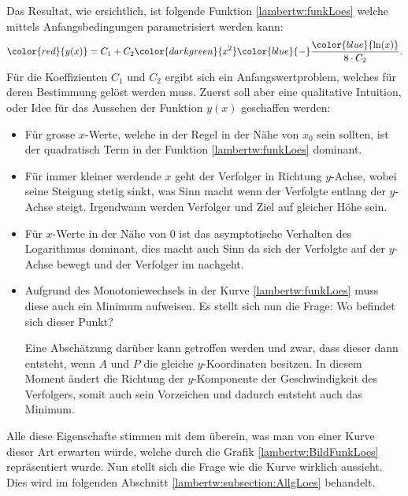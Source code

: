 Das Resultat, wie ersichtlich, ist folgende Funktion \eqref{lambertw:funkLoes} welche mittels Anfangsbedingungen parametrisiert werden kann: 
\begin{equation}
	{\color{red}{y(x)}}
	=
	C_1 + C_2 {\color{darkgreen}{x^2}} {\color{blue}{-}} \frac{\color{blue}{\operatorname{ln}(x)}}{8 \cdot C_2}.
	\label{lambertw:funkLoes}
\end{equation}
Für die Koeffizienten \(C_1\) und \(C_2\) ergibt sich ein Anfangswertproblem, welches für deren Bestimmung gelöst werden muss. Zuerst soll aber eine qualitative Intuition, oder Idee für das Aussehen der Funktion \(y(x)\) geschaffen werden:
\begin{itemize}
	\item
	Für grosse \(x\)-Werte, welche in der Regel in der Nähe von \(x_0\) sein sollten, ist der quadratisch Term in der Funktion \eqref{lambertw:funkLoes} dominant. 
	\item
	Für immer kleiner werdende \(x\) geht der Verfolger in Richtung \(y\)-Achse, wobei seine Steigung stetig sinkt, was Sinn macht wenn der Verfolgte entlang der \(y\)-Achse steigt. Irgendwann werden Verfolger und Ziel auf gleicher Höhe sein.
	\item
	Für \(x\)-Werte in der Nähe von \(0\) ist das asymptotische Verhalten des Logarithmus dominant, dies macht auch Sinn da sich der Verfolgte auf der \(y\)-Achse bewegt und der Verfolger im nachgeht.
	\item
	Aufgrund des Monotoniewechsels in der Kurve \eqref{lambertw:funkLoes} muss diese auch ein Minimum aufweisen. Es stellt sich nun die Frage: Wo befindet sich dieser Punkt? 
	
	Eine Abschätzung darüber kann getroffen werden und zwar, dass dieser dann entsteht, wenn \(A\) und \(P\) die gleiche \(y\)-Koordinaten besitzen. In diesem Moment ändert die Richtung der \(y\)-Komponente der Geschwindigkeit des Verfolgers, somit auch sein Vorzeichen und dadurch entsteht auch das Minimum.
\end{itemize}
Alle diese Eigenschafte stimmen mit dem überein, was man von einer Kurve dieser Art erwarten würde, welche durch die Grafik \ref{lambertw:BildFunkLoes} repräsentiert wurde. Nun stellt sich die Frage wie die Kurve wirklich aussieht. Dies wird im folgenden Abschnitt \ref{lambertw:subsection:AllgLoes} behandelt.

